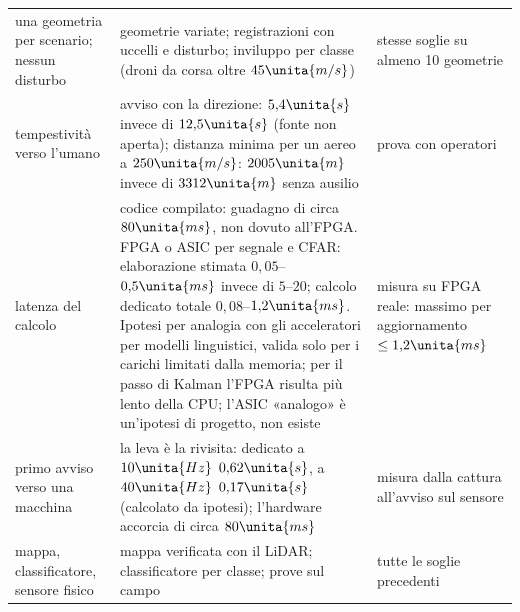 \begin{table}[H]
\begin{tabularx}{\linewidth}{@{}>{\RaggedRight\arraybackslash}p{3.3cm}L>{\RaggedRight\arraybackslash}p{4.4cm}@{}}
una geometria per scenario; nessun disturbo & geometrie variate; registrazioni con uccelli e disturbo; inviluppo per classe (droni da corsa oltre $45\unita{m/s}$) & stesse soglie su almeno 10 geometrie\\
tempestività verso l'umano & avviso con la direzione: $5{,}4\unita{s}$ invece di $12{,}5\unita{s}$ (fonte non aperta); distanza minima per un aereo a $250\unita{m/s}$: $2005\unita{m}$ invece di $3312\unita{m}$ senza ausilio & prova con operatori\\
latenza del calcolo & codice compilato: guadagno di circa $80\unita{ms}$, non dovuto all'FPGA. FPGA o ASIC per segnale e CFAR: elaborazione stimata $0{,}05$--$0{,}5\unita{ms}$ invece di $5$--$20$; calcolo dedicato totale $0{,}08$--$1{,}2\unita{ms}$. Ipotesi per analogia con gli acceleratori per modelli linguistici, valida solo per i carichi limitati dalla memoria; per il passo di Kalman l'FPGA risulta più lento della CPU; l'ASIC «analogo» è un'ipotesi di progetto, non esiste & misura su FPGA reale: massimo per aggiornamento $\le1{,}2\unita{ms}$\\
primo avviso verso una macchina & la leva è la rivisita: dedicato a $10\unita{Hz}$ $0{,}62\unita{s}$, a $40\unita{Hz}$ $0{,}17\unita{s}$ (calcolato da ipotesi); l'hardware accorcia di circa $80\unita{ms}$ & misura dalla cattura all'avviso sul sensore\\
mappa, classificatore, sensore fisico & mappa verificata con il LiDAR; classificatore per classe; prove sul campo & tutte le soglie precedenti\\
\bottomrule
\end{tabularx}
\end{table}


